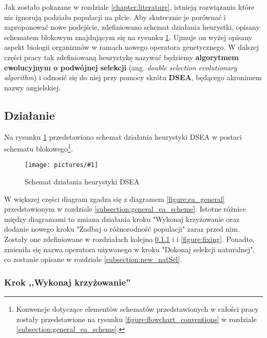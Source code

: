\documentclass[twoside]{iisthesis}
\newcommand{\img}[1]{\texttt{[image: pictures/\#1]}}
\begin{document}
Jak zostało pokazane w rozdziale \ref{chapter:literature}, istnieją rozwiązania które nie ignorują podziału populacji na płcie. Aby skutecznie je porównać i zaproponować nowe podejście, zdefiniowano schemat działania heurystki, opisany schematem blokowym znajdującym się na rysunku \ref{figure:dsea}. Ujmuje on wyżej opisany aspekt biologii organizmów w ramach nowego operatora genetycznego. W dalszej części pracy tak zdefiniowaną heurystykę nazywać będziemy \textbf{algorytmem ewolucyjnym o podwójnej selekcji} (ang. \emph{double selection evolutionary algorithm}) i odnosić się do niej przy pomocy skrótu \textbf{DSEA}, będącego akronimem nazwy angielskiej.

\subsection{Działanie} \label{subsection:dsea_scheme}

Na rysunku \ref{figure:dsea} przedstawiono schemat działania heurystyki DSEA w postaci schematu blokowego\footnote{Konwencje dotyczące elementów schematów przedstawionych w całości pracy zostały przedstawione na rysunku \ref{figure:flowchart_conventions} w rozdziale \ref{subsection:general_ea_scheme}.}. 

\begin{figure}[H]
	\caption{Schemat działania heurystyki DSEA \label{figure:dsea}}
	\img{dsea.png}
\end{figure}

W większej części diagram zgadza się z diagramem \ref{figure:ea_general} przedstawionym w rozdziale \ref{subsection:general_ea_scheme}. Istotne różnice między diagramami to zmiana działania kroku "Wykonaj krzyżowanie oraz dodanie nowego kroku "Zadbaj o różnorodność populacji" zaraz przed nim. Zostały one zdefiniowane w rozdziałach kolejno \ref{subsubsection:my_crossover} i  i \ref{figure:fixing}. Ponadto, zmieniła się nazwa operatora używanego w kroku "Dokonaj selekcji naturalnej", co zostanie opisane w rozdziale \ref{subsection:new_natSel}.

\subsubsection{Krok ,,Wykonaj krzyżowanie''} \label{subsubsection:my_crossover}
\end{document}
